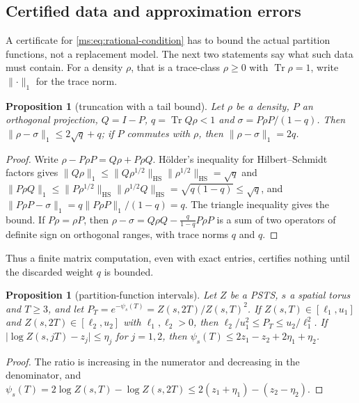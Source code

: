 \documentclass[11pt,a4paper]{amsart}
\newtheorem{proposition}[theorem]{Proposition}
\theoremstyle{definition}
\theoremstyle{remark}
\numberwithin{equation}{section}
\DeclareMathOperator{\Tr}{Tr}        %
\newcommand{\norm}[1]{\lVert #1\rVert}     %
\newcommand{\abs}[1]{\lvert #1\rvert}      %
\newcommand{\PSTS}{\textup{PSTS}}          %
\newcommand{\Zpart}[2]{Z(#1,#2)}           %
\newcommand{\psiT}[2]{\psi_{#1}(#2)}       %
\begin{document}
\subsection{Certified data and approximation errors}

A certificate for \eqref{ms:eq:rational-condition} has to bound the actual partition functions, not a replacement model. The next two statements say what such data must contain. For a density $\rho$, that is a trace-class $\rho\ge0$ with $\Tr\rho=1$, write $\norm{\cdot}_1$ for the trace norm.

\begin{proposition}[truncation with a tail bound]\label{ms:prop:truncation}
Let $\rho$ be a density, $P$ an orthogonal projection, $Q=I-P$, $q=\Tr Q\rho<1$ and $\sigma=P\rho P/(1-q)$. Then $\norm{\rho-\sigma}_1\le2\sqrt q+q$; if $P$ commutes with $\rho$, then $\norm{\rho-\sigma}_1=2q$.
\end{proposition}

\begin{proof}
Write $\rho-P\rho P=Q\rho+P\rho Q$. H\"older's inequality for Hilbert--Schmidt factors gives $\norm{Q\rho}_1\le\norm{Q\rho^{1/2}}_{\mathrm{HS}}\norm{\rho^{1/2}}_{\mathrm{HS}}=\sqrt q$ and $\norm{P\rho Q}_1\le\norm{P\rho^{1/2}}_{\mathrm{HS}}\norm{\rho^{1/2}Q}_{\mathrm{HS}}=\sqrt{q(1-q)}\le\sqrt q$, and $\norm{P\rho P-\sigma}_1=q\norm{P\rho P}_1/(1-q)=q$. The triangle inequality gives the bound. If $P\rho=\rho P$, then $\rho-\sigma=Q\rho Q-\frac{q}{1-q}P\rho P$ is a sum of two operators of definite sign on orthogonal ranges, with trace norms $q$ and $q$.
\end{proof}

Thus a finite matrix computation, even with exact entries, certifies nothing until the discarded weight $q$ is bounded.

\begin{proposition}[partition-function intervals]\label{ms:prop:intervals}
Let $Z$ be a \PSTS, $s$ a spatial torus and $T\ge3$, and let $P_T=e^{-\psiT{s}{T}}=\Zpart{s}{2T}/\Zpart{s}{T}^2$. If $\Zpart{s}{T}\in[\ell_1,u_1]$ and $\Zpart{s}{2T}\in[\ell_2,u_2]$ with $\ell_1,\ell_2>0$, then $\ell_2/u_1^2\le P_T\le u_2/\ell_1^2$. If $\abs{\log\Zpart{s}{jT}-z_j}\le\eta_j$ for $j=1,2$, then $\psiT{s}{T}\le2z_1-z_2+2\eta_1+\eta_2$.
\end{proposition}

\begin{proof}
The ratio is increasing in the numerator and decreasing in the denominator, and $\psiT{s}{T}=2\log\Zpart{s}{T}-\log\Zpart{s}{2T}\le2(z_1+\eta_1)-(z_2-\eta_2)$.
\end{proof}
\end{document}
